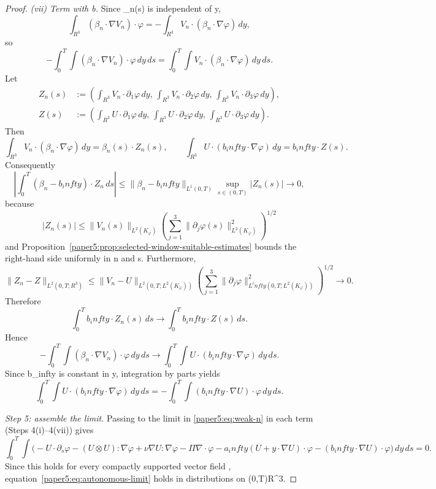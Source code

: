 \documentclass[11pt]{amsart}
\def\({}%
\def\){}%
\def\mathbb#1{#1}%
\def\infty{infty}%
\theoremstyle{plain}
\theoremstyle{definition}
\theoremstyle{remark}
\begin{document}
\begin{proof}
\medskip
\noindent\textit{(vii) Term with \(b\).}
Since \(\beta_n(s)\) is independent of \(y\),
\[
  \int_{\mathbb R^3}(\beta_n\cdot\nabla V_n)\cdot\varphi
  =-\int_{\mathbb R^3}V_n\cdot(\beta_n\cdot\nabla\varphi)
  \,dy,
\]
so
\[
  -\int_0^T\!\int(\beta_n\cdot\nabla V_n)\cdot\varphi
  \,dy\,ds
  =
  \int_0^T\!\int V_n\cdot(\beta_n\cdot\nabla\varphi)
  \,dy\,ds.
\]
Let
\[
\begin{aligned}
Z_n(s)&:=\left(\int_{\mathbb R^3}V_n\cdot\partial_1\varphi\,dy,\,
\int_{\mathbb R^3}V_n\cdot\partial_2\varphi\,dy,\,
\int_{\mathbb R^3}V_n\cdot\partial_3\varphi\,dy\right),\\
Z(s)&:=\left(\int_{\mathbb R^3}U\cdot\partial_1\varphi\,dy,\,
\int_{\mathbb R^3}U\cdot\partial_2\varphi\,dy,\,
\int_{\mathbb R^3}U\cdot\partial_3\varphi\,dy\right).
\end{aligned}
\]
Then
\[
  \int_{\mathbb R^3}V_n\cdot(\beta_n\cdot\nabla\varphi)\,dy
  =\beta_n(s)\cdot Z_n(s),\qquad
  \int_{\mathbb R^3}U\cdot(b_\infty\cdot\nabla\varphi)\,dy
  =b_\infty\cdot Z(s).
\]
Consequently
\[
  \left|\int_0^T\!(\beta_n-b_\infty)\cdot Z_n\,ds\right|
  \le
  \|\beta_n-b_\infty\|_{L^1(0,T)}\sup_{s\in(0,T)}|Z_n(s)|\to0,
\]
because
\[
  |Z_n(s)|\le
  \|V_n(s)\|_{L^2(K_\varphi)}
  \left(\sum_{j=1}^3\|\partial_j\varphi(s)\|_{L^2(K_\varphi)}^2\right)^{1/2}
\]
and Proposition~\ref{paper5:prop:selected-window-suitable-estimates} bounds the right-hand side
uniformly in \(n\) and \(s\). Furthermore,
\[
  \|Z_n-Z\|_{L^2(0,T;\mathbb R^3)}
  \le
  \|V_n-U\|_{L^2(0,T;L^2(K_\varphi))}
  \left(\sum_{j=1}^3\|\partial_j\varphi\|_{L^\infty(0,T;L^2(K_\varphi))}^2\right)^{1/2}
  \to0.
\]
Therefore
\[
  \int_0^T b_\infty\cdot Z_n(s)\,ds
  \to
  \int_0^T b_\infty\cdot Z(s)\,ds.
\]
Hence
\[
  -\int_0^T\!\int (\beta_n\cdot\nabla V_n)\cdot\varphi
  \,dy\,ds
  \to
  \int_0^T\!\int U\cdot(b_\infty\cdot\nabla\varphi)
  \,dy\,ds.
\]
Since \(b_\infty\) is constant in \(y\), integration by parts yields
\[
  \int_0^T\!\int U\cdot(b_\infty\cdot\nabla\varphi)
  \,dy\,ds
  =
  -\int_0^T\!\int (b_\infty\cdot\nabla U)\cdot\varphi
  \,dy\,ds.
\]

\emph{Step 5: assemble the limit.}
Passing to the limit in \eqref{paper5:eq:weak-n} in each term (Steps 4(i)--4(vii)) gives
\[
  \int_0^T\!\int
  \bigl(
  -U\cdot\partial_s\varphi
  -(U\otimes U):\nabla\varphi
  +\nu\nabla U:\nabla\varphi
  -\Pi\nabla\cdot\varphi
  -a_\infty(U+y\cdot\nabla U)\cdot\varphi
  -(b_\infty\cdot\nabla U)\cdot\varphi
  \bigr)
  \,dy\,ds=0.
\]
Since this holds for every compactly supported vector field \(\varphi\), equation~\eqref{paper5:eq:autonomous-limit} holds in distributions on
\((0,T)\times\mathbb R^3\).
\end{proof}
\end{document}
